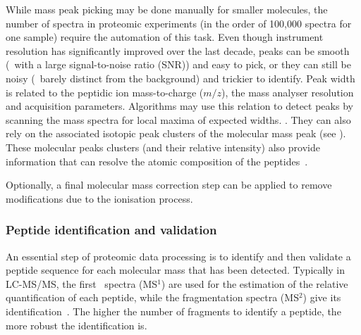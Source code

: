 While mass peak picking may be done manually for smaller molecules,
the number of spectra in proteomic experiments
(in the order of 100,000 spectra for one sample)
require the automation of this task.
Even though instrument resolution has significantly improved over the last decade,
peaks can be smooth (\ie\ with a large signal-to-noise ratio (\gls{SNR}))
and easy to pick, or they can still be noisy
(\ie\ barely distinct from the background) and trickier to identify.
Peak width is related to the peptidic ion mass-to-charge ($m/z$),
the mass analyser resolution and acquisition parameters.
Algorithms may use this relation to detect peaks by
scanning the mass spectra for local maxima of expected widths. .
They can also rely on
the associated isotopic peak clusters of the molecular mass peak
(see ).
These molecular peaks clusters (and their relative intensity) also provide
information that can resolve the atomic composition of the peptides~.

Optionally, a final molecular mass correction step can be applied to remove
modifications due to the ionisation process.


\subsubsection{Peptide identification and validation}\label{subsub:peptideID}

An essential step of proteomic data processing is to identify and then validate
a peptide sequence for each molecular mass that has been detected.
Typically in \gls{LC-MS/MS},
the first \ms\ spectra (MS$^1$) are used for the estimation of the relative
quantification of each peptide,
while the fragmentation spectra (MS$^2$) give its identification~.
The higher the number of fragments to identify a peptide,
the more robust the identification is.

